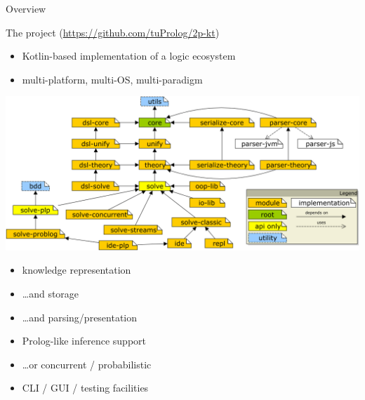 \documentclass[presentation]{beamer}\mode<presentation>{\usetheme{AMSBolognaFC}}
\begin{document}
\begin{frame}{Overview}
    \begin{block}{The \twopkt{} project \hfill (\url{https://github.com/tuProlog/2p-kt})}
        \begin{itemize}
            \item Kotlin-based implementation of a logic ecosystem
            \item multi-platform, multi-OS, multi-paradigm
        \end{itemize}
    \end{block} 

    \begin{center}
        \includegraphics[width=.7\linewidth]{figures/project-map.png}    
    \end{center}

    \begin{multicols}{2}
        \begin{itemize}\small
            \item knowledge representation
            
            \item \ldots and storage
            
            \item \ldots and parsing/presentation

            \item Prolog-like inference support
            \item \ldots or concurrent / probabilistic
            
            \item CLI / GUI / testing facilities
        \end{itemize}
    \end{multicols}
\end{frame}

\end{document}
